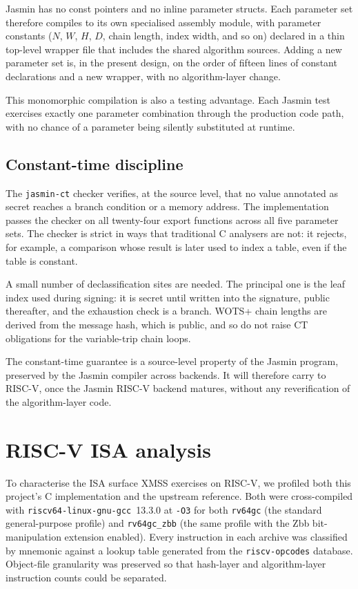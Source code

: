 \documentclass[11pt,a4paper]{article}
\begin{document}
Jasmin has no const pointers and no inline parameter structs. Each
parameter set therefore compiles to its own specialised assembly
module, with parameter constants ($N$, $W$, $H$, $D$, chain length,
index width, and so on) declared in a thin top-level wrapper file
that includes the shared algorithm sources. Adding a new parameter
set is, in the present design, on the order of fifteen lines of
constant declarations and a new wrapper, with no algorithm-layer
change.

This monomorphic compilation is also a testing advantage. Each
Jasmin test exercises exactly one parameter combination through the
production code path, with no chance of a parameter being silently
substituted at runtime.

\subsection{Constant-time discipline}

The \texttt{jasmin-ct} checker verifies, at the source level, that
no value annotated as secret reaches a branch condition or a memory
address. The implementation passes the checker on all twenty-four
export functions across all five parameter sets. The checker is
strict in ways that traditional C analysers are not: it rejects, for
example, a comparison whose result is later used to index a table,
even if the table is constant.

A small number of declassification sites are needed. The principal
one is the leaf index used during signing: it is secret until
written into the signature, public thereafter, and the exhaustion
check is a branch. WOTS+ chain lengths are derived from
the message hash, which is public, and so do not raise CT
obligations for the variable-trip chain loops.

The constant-time guarantee is a source-level property of the
Jasmin program, preserved by the Jasmin compiler across backends.
It will therefore carry to RISC-V, once the Jasmin RISC-V backend
matures, without any reverification of the algorithm-layer code.

\section{RISC-V ISA analysis}

To characterise the ISA surface XMSS exercises on RISC-V, we
profiled both this project's C implementation and the upstream
reference. Both were cross-compiled with
\texttt{riscv64-linux-gnu-gcc}~13.3.0 at \texttt{-O3} for both
\texttt{rv64gc} (the standard general-purpose profile) and
\texttt{rv64gc\_zbb} (the same profile with the Zbb
bit-manipulation extension enabled). Every instruction in each
archive was classified by mnemonic against a lookup table generated
from the \texttt{riscv-opcodes} database. Object-file granularity
was preserved so that hash-layer and algorithm-layer instruction
counts could be separated.
\end{document}
